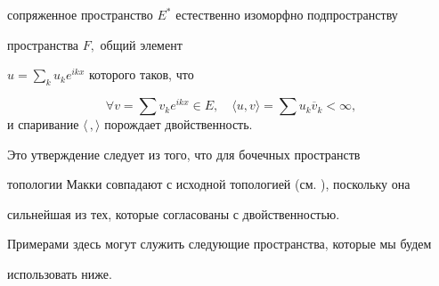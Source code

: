 сопряженное пространство $E^*$ естественно изоморфно подпространству

пространства $F,$ общий элемент 

$u = \sum_k u_k e^{i k x}$ которого таков, что

$$\forall v = \sum v_k e^{i k x} \in E, \quad  \langle u, v \rangle = \sum u_k \overline v_k

< \infty,$$ и спаривание $\langle\,{},{}\rangle$ порождает двойственность\rm.

\smallskip



Это  утверждение  следует  из того, что для бочечных пространств

топологии Макки совпадают с исходной топологией (см. \cite{bur:5}), поскольку она

сильнейшая из тех, которые согласованы с двойственностью.



\smallskip

Примерами здесь могут служить следующие пространства, которые мы будем

использовать ниже.



